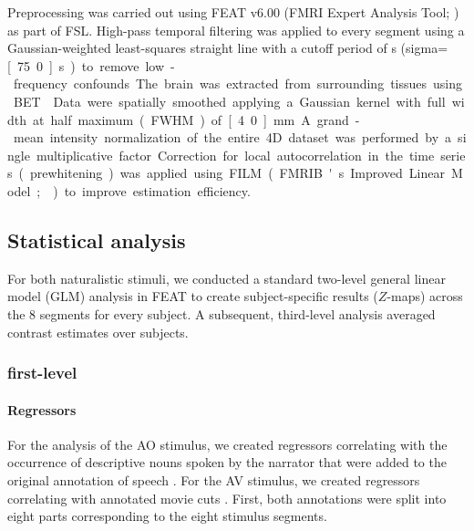\documentclass[english]{article}
\begin{document}
Preprocessing was carried out using FEAT v6.00 (FMRI Expert Analysis Tool;
\citep{woolrich2001autocorr}) as part of FSL.
High-pass temporal filtering was applied to every segment using a
Gaussian-weighted least-squares straight line with a cutoff period of
\unit[150]{s} (sigma=\unit[75.0]{s}) to remove low-frequency confounds.
The brain was extracted from surrounding tissues using BET \citep{smith2002bet}.
Data were spatially smoothed applying a Gaussian kernel with full width at half
maximum (FWHM) of \unit[4.0]{mm}.
A grand-mean intensity normalization of the entire 4D dataset was performed by a
single multiplicative factor.
Correction for local autocorrelation in the time series (prewhitening) was
applied using FILM (FMRIB's Improved Linear Model; \citep{woolrich2001autocorr})
to improve estimation efficiency.

\subsection{Statistical analysis}

For both naturalistic stimuli, we conducted a standard two-level general linear
model (GLM) analysis in FEAT to create subject-specific results ($Z$-maps)
across the 8 segments for every subject. A subsequent, third-level analysis averaged contrast estimates over subjects.


\subsubsection{first-level}

\paragraph{Regressors}


For the analysis of the AO stimulus, we created regressors correlating with the
occurrence of descriptive nouns spoken by the narrator that were added to the original annotation of speech \citep{haeusler2020speechanno}.
For the AV stimulus, we created regressors correlating with annotated movie cuts \citep{haeusler2016cutanno}.
First, both annotations were split into eight parts corresponding to the eight
stimulus segments.
\end{document}
